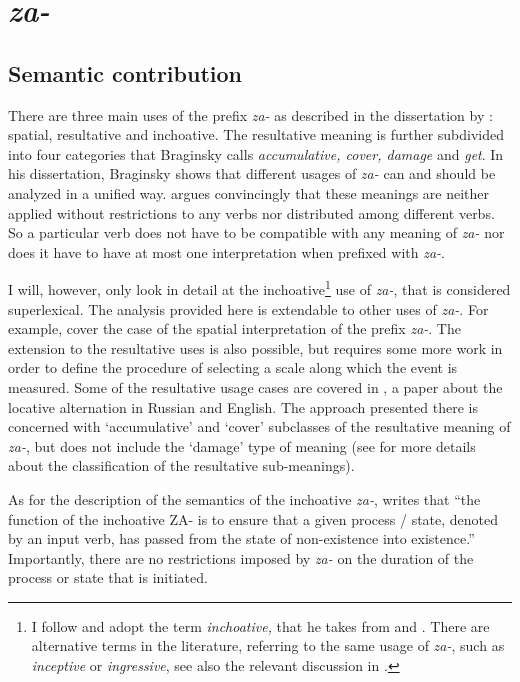 \section{\textit{za-}}\label{subsection:semantics:za}
\subsection{Semantic contribution}
There are three main uses of the prefix \textit{za-} as described in the dissertation by \citet{Braginsky:08}: spatial, resultative and inchoative. The resultative meaning is further subdivided into four categories that Braginsky calls \textit{accumulative, cover, damage} and \textit{get}. In his dissertation, Braginsky shows that different usages of \textit{za-} can and should be analyzed in a unified way. \citet{Braginsky:08} argues convincingly that these meanings are neither applied without restrictions to any verbs nor distributed among different verbs. So a particular verb does not have to be compatible with any meaning of \textit{za-} nor does it have to have at most one interpretation when prefixed with \textit{za-}.

I will, however, only look in detail at the inchoative\footnote{I follow \citet{Braginsky:08} and adopt the term \textit{inchoative,} that he takes from \citealt{Zemskaja:55} and \citealt{Zaliznjak:95}. There are alternative terms in the literature, referring to the same usage of \textit{za-}, such as \textit{inceptive} or \textit{ingressive}, see also the relevant discussion in \citealt{Maslov:65}.} use of \textit{za-}, that is considered superlexical. The analysis provided here is extendable to other uses of \textit{za-}. For example, \cite{ZinovaOsswald:paper} cover the case of the spatial interpretation of the prefix \textit{za-}. The extension to the resultative uses is also possible, but requires some more work in order to define the procedure of selecting a scale along which the event is measured. Some of the resultative usage cases are covered in \citet{Zinova:14}, a paper about the locative alternation in Russian and English. The approach presented there is concerned with `accumulative' and `cover' subclasses of the resultative meaning of \textit{za-}, but does not include the `damage' type of meaning (see \citealt{Braginsky:08} for more details about the classification of the resultative sub-meanings).

As for the description of the semantics of the inchoative \textit{za-}, \citet{Braginsky:08} writes \citep[also referring to the work of][]{Sheljakin:69} that ``the function of the inchoative ZA- is to ensure that a given process / state, denoted by an input verb, has passed from the state of non-existence into existence.'' Importantly, there are no restrictions imposed by \textit{za-} on the duration of the process or state that is initiated.

